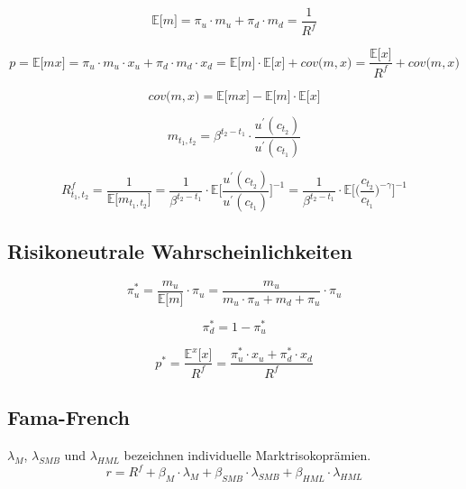 \begin{equation}
	\mathbb{E} \big\lbrack m \big\rbrack = \pi_u \cdot m_u + \pi_d \cdot m_d = \frac{1}{R^f} \label{eq:E}
\end{equation}

\begin{equation}
	p = \mathbb{E} \big\lbrack m x \big\rbrack = \pi_u \cdot m_u \cdot x_u + \pi_d \cdot m_d \cdot x_d = \mathbb{E} \big\lbrack m \big\rbrack \cdot \mathbb{E} \big\lbrack x \big\rbrack + cov\big(m,x\big) = \frac{\mathbb{E} \big\lbrack x \big\rbrack}{R^f} + cov\big(m,x\big) \label{eq:p}
\end{equation}

\begin{equation}
	cov\big(m,x\big) = \mathbb{E} \big\lbrack m x \big\rbrack - \mathbb{E} \big\lbrack m \big\rbrack \cdot \mathbb{E} \big\lbrack x \big\rbrack
\end{equation}

\begin{equation}
	m_{t_1,t_2} = \beta^{t_2 - t_1} \cdot \frac{u^\prime(c_{t_2})}{u^\prime(c_{t_1})} \label{eq:m}
\end{equation}

\begin{equation}
	R^f_{t_1, t_2} = \frac{1}{\mathbb{E} \big\lbrack m_{t_1,t_2} \big\rbrack} = \frac{1}{\beta^{t_2-t_1}} \cdot \mathbb{E} \Bigg\lbrack \frac{u^\prime(c_{t_2})}{u^\prime(c_{t_1})} \Bigg\rbrack^{-1} = \frac{1}{\beta^{t_2-t_1}} \cdot \mathbb{E} \Bigg\lbrack \bigg( \frac{c_{t_2}}{c_{t_1}} \bigg)^{-\gamma} \Bigg\rbrack^{-1} \label{eq:rf}
\end{equation}


\subsection{Risikoneutrale Wahrscheinlichkeiten}

\begin{equation}
	\pi^*_u = \frac{m_u}{\mathbb{E} \big\lbrack m \big\rbrack} \cdot \pi_u = \frac{m_u}{m_u \cdot \pi_u + m_d + \pi_u} \cdot \pi_u
\end{equation}

\begin{equation}
	\pi^*_d = 1 - \pi^*_u
\end{equation}

\begin{equation}
	p^* = \frac{\mathbb{E}^x \big\lbrack x \big\rbrack}{R^f} = \frac{\pi^*_u \cdot x_u + \pi^*_d \cdot x_d}{R^f}
\end{equation}


\subsection{Fama-French}

\(\lambda_M\), \(\lambda_{SMB}\) und \(\lambda_{HML}\) bezeichnen individuelle Marktrisokoprämien.
\begin{equation}
	r = R^f + \beta_M \cdot \lambda_M + \beta_{SMB} \cdot \lambda_{SMB} + \beta_{HML} \cdot \lambda_{HML} \label{eq:ff}
\end{equation}
